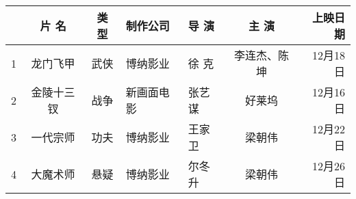 \documentclass[a4paper]{article}
\newcommand{\zihao}{\fontsize{15.75pt}{\baselineskip}\selectfont}
\begin{document}
 \zihao

 

\begin{tabular}{|r|c|c|l|l|c|r|}

 

   \hline

      & 片 名 & 类 型 & 制作公司 & 导 演 & 主 演 & 上映日期 \\

    \hline

    1 & 龙门飞甲 & 武侠 & 博纳影业  & 徐 克 &李连杰、陈坤 & 12月18日 \\

    \hline

    2 & 金陵十三钗 & 战争 & 新画面电影 & 张艺谋 & 好莱坞 & 12月16日 \\

    \hline

    3 & 一代宗师 & 功夫 & 博纳影业 & 王家卫 & 梁朝伟 & 12月22日 \\

    \hline

    4 & 大魔术师 & 悬疑 & 博纳影业 & 尔冬升 & 梁朝伟 & 12月26日 \\

    \hline

 

\end{tabular}

 
\end{document}
